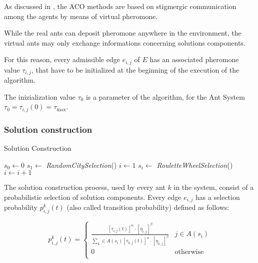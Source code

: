 \begin{homeworkProblem}
As discussed in , the ACO methods are based on stigmergic communication among the agents by means of virtual pheromone.

While the real ants can deposit pheromone anywhere in the environment, the virtual ants may only exchange informations concerning solutions components.

For this reason, every admissible edge $e_{i,j}$ of $E$ has an associated pheromone value $\tau_{i,j}$, that have to be initialized at the beginning of the execution of the algorithm.

The inizialization value $\tau_0$ is a parameter of the algorithm, for the \maxmin Ant System $\tau_0 = \tau_{i,j}(0) = \tau_{\max}$. 


\subsubsection{Solution construction}
\begin{algorithm}[!h]
  \caption{Solution Construction}\label{sol}
  \begin{algorithmic}[1]
      \State {}
      \State $s_0 \gets 0$ 
      \State $s_1 \gets$ \emph{RandomCitySelection}() 
      \State $i \gets 1$
        \State $s_i \gets $ \emph{RouletteWheelSelection}()  
        \State $i \gets i+1$
      \EndWhile
    \EndProcedure
\end{algorithmic}
\end{algorithm}

The solution construction process, used by every ant $k$ in the system, consist of a probabilistic selection of solution components.
Every edge $e_{i,j}$ has a selection probability $p_{i,j}^k(t)$ (also called transition probability) defined as follows:

\begin{equation} \label{eq:tranprob}
p_{i,j}^k(t) = \begin{cases}
  \frac{[\tau_{i,j}(t)]^\alpha \cdot [\eta_{i,j}]^\beta}{\sum_{k} \in A(s_{i}) [\tau_{k,j}(t)]^\alpha \cdot [\eta_{k,j}]^\beta} & j \in A(s_{i}) \\
 0 & \text{otherwise} \\
\end{cases}
\end{equation}


\end{homeworkProblem}
